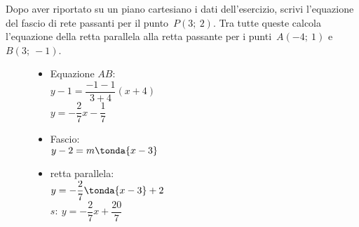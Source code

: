  \begin{esempio}
  Dopo aver riportato su un piano cartesiano i dati dell'esercizio,
  scrivi l'equazione del fascio di rete passanti per il punto~\(P(3;~2)\).
  Tra tutte queste calcola l'equazione della retta parallela alla retta 
  passante per i punti~\(A(-4;~1)\) e~\(B(3;~-1)\).
  
\begin{inaccessibleblock}
 \begin{figure}[h]
\centering \hspace{-5mm}
 \begin{minipage}[]{.40\textwidth}
  \begin{itemize}
  \item Equazione \(AB\):\\
\(y - 1 = \dfrac{-1 - 1}{3 +4} (x +4)\)\\
  \(y = -\dfrac{2}{7} x -\dfrac{1}{7}\)
  \item Fascio: \\
  \(y - 2 = m \tonda{x - 3}\)
  \item retta parallela: \\
  \(y = -\dfrac{2}{7} \tonda{x - 3} +2\)\\
  \(s:~y = -\dfrac{2}{7} x +\dfrac{20}{7}\)
  \end{itemize}
 \end{minipage}
 \begin{minipage}[]{.60\textwidth}
   \centering \duepuntiparall
 \end{minipage}
\label{fig:duepuntiparall}
\end{figure}
\end{inaccessibleblock}
 \end{esempio}

